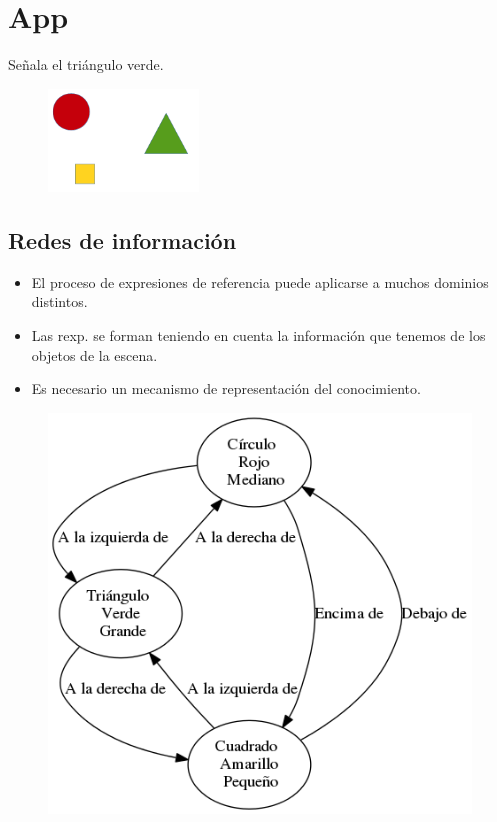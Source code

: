 \documentclass{beamer}
\begin{document}
	\section{App}
	
	\begin{frame}
		Señala el triángulo verde.
		
		\begin{figure}[H]
			\centering
			\includegraphics[width=40mm]{img/ejemplo1.png}			
		\end{figure}
	\end{frame}
	
	\subsection{Redes de información}
	
	\begin{frame}
		\begin{itemize}
			\item El proceso de expresiones de referencia puede aplicarse a muchos dominios distintos.
			\item Las rexp. se forman teniendo en cuenta la información que tenemos de los objetos de la escena.
			\item Es necesario un mecanismo de representación del conocimiento.
		\end{itemize}
	\end{frame}
	
	\begin{frame}
		\begin{figure}[H]
			\centering
			\includegraphics[scale=0.4]{img/RIejemplo1.png}
		\end{figure}
	\end{frame}
	
\end{document}
